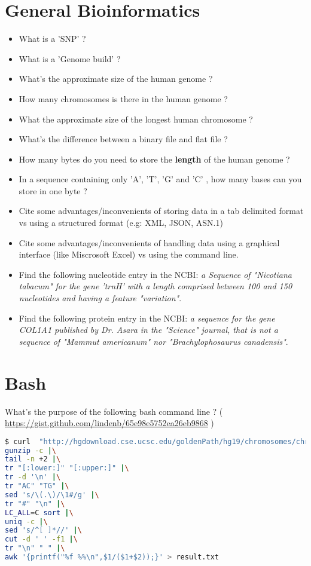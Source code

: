 \documentclass{article}
\begin{document}
%

\section{General Bioinformatics}
\begin{itemize}
\item What is a 'SNP' ? 
\item What is a 'Genome build' ?
\item What's the approximate size of the human genome ?
\item How many chromosomes is there in the human genome ?
\item What the approximate size of the longest human chromosome ?
\item What's the difference between a binary file and flat file ?
\item How many bytes do you need to store the \textbf{length} of the human genome ?
\item In a sequence containing only 'A', 'T', 'G' and 'C' , how many bases can you store in one byte ?
\item Cite some advantages/inconvenients of storing data in a tab delimited format vs using a structured format (e.g: XML, JSON, ASN.1)
\item Cite some advantages/inconvenients of handling data using a graphical interface (like Miscrosoft Excel) vs using the command line.
\item Find the following nucleotide entry in the NCBI:\emph{ a Sequence of "Nicotiana tabacum" for the gene 'trnH' with a length comprised between 100 and 150 nucleotides and having a feature "variation"}.
\item Find the following protein entry in the NCBI:\emph{ a sequence for the gene COL1A1 published by Dr. Asara in the "Science" journal,  that is not a sequence of "Mammut americanum" nor "Brachylophosaurus canadensis"}.
\end{itemize}

\section{Bash}
\noindent
What's the purpose of the following bash command line ? ( \url{https://gist.github.com/lindenb/65e98e5752ea26eb9868} )

\begin{lstlisting}[language=bash]
$ curl  "http://hgdownload.cse.ucsc.edu/goldenPath/hg19/chromosomes/chrM.fa.gz" |\
gunzip -c |\
tail -n +2 |\
tr "[:lower:]" "[:upper:]" |\
tr -d '\n' |\
tr "AC" "TG" |\
sed 's/\(.\)/\1#/g' |\
tr "#" "\n" |\
LC_ALL=C sort |\
uniq -c |\
sed 's/^[ ]*//' |\
cut -d ' ' -f1 |\
tr "\n" " " |\
awk '{printf("%f %%\n",$1/($1+$2));}' > result.txt
\end{lstlisting}
\end{document}
